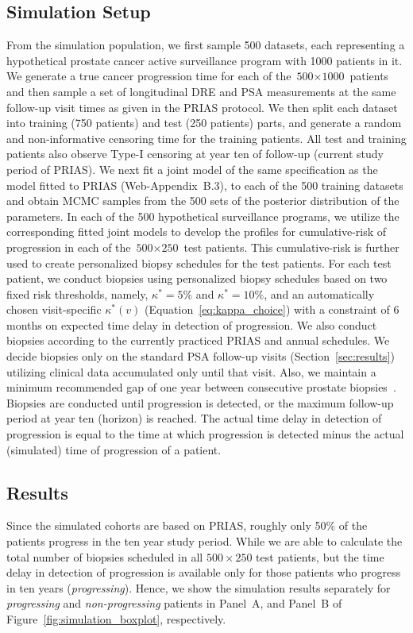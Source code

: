 \subsection{Simulation Setup}
From the simulation population, we first sample 500 datasets, each representing a hypothetical prostate cancer active surveillance program with 1000 patients in it. We generate a true cancer progression time for each of the ${\mbox{500} \times \mbox{1000}}$ patients and then sample a set of longitudinal DRE and PSA measurements at the same follow-up visit times as given in the PRIAS protocol. We then split each dataset into training (750 patients) and test (250 patients) parts, and generate a random and non‐informative censoring time for the training patients. All test and training patients also observe Type-I censoring at year ten of follow-up (current study period of PRIAS). We next fit a joint model of the same specification as the model fitted to PRIAS (Web-Appendix~B.3), to each of the 500 training datasets and obtain MCMC samples from the 500 sets of the posterior distribution of the parameters. In each of the 500 hypothetical surveillance programs, we utilize the corresponding fitted joint models to develop the profiles for cumulative-risk of progression in each of the ${\mbox{500} \times \mbox{250}}$ test patients. This cumulative-risk is further used to create personalized biopsy schedules for the test patients. For each test patient, we conduct biopsies using personalized biopsy schedules based on two fixed risk thresholds, namely, $\kappa^*=5\%$ and $\kappa^*=10\%$, and an automatically chosen visit-specific $\kappa^*(v)$ (Equation~\ref{eq:kappa_choice}) with a constraint of 6 months on expected time delay in detection of progression. We also conduct biopsies according to the currently practiced PRIAS and annual schedules. We decide biopsies only on the standard PSA follow-up visits (Section~\ref{sec:results}) utilizing clinical data accumulated only until that visit. Also, we maintain a minimum recommended gap of one year between consecutive prostate biopsies~\citep{bokhorst2015compliance}. Biopsies are conducted until progression is detected, or the maximum follow-up period at year ten (horizon) is reached. The actual time delay in detection of progression is equal to the time at which progression is detected minus the actual (simulated) time of progression of a patient.

\subsection{Results}
Since the simulated cohorts are based on PRIAS, roughly only 50\% of the patients progress in the ten year study period. While we are able to calculate the total number of biopsies scheduled in all $500 \times 250$ test patients, but the time delay in detection of progression is available only for those patients who progress in ten years (\textit{progressing}). Hence, we show the simulation results separately for \textit{progressing} and \textit{non-progressing} patients in Panel~A, and Panel~B of Figure~\ref{fig:simulation_boxplot}, respectively.

